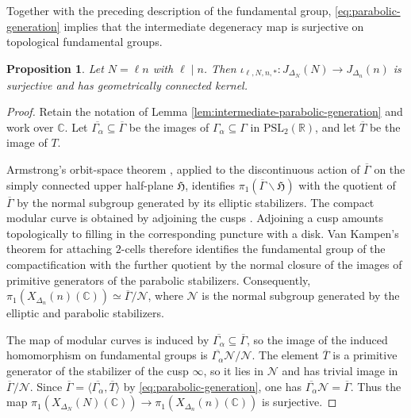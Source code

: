 \documentclass[12pt, letterpaper]{amsart}
\newtheorem{proposition}[theorem]{Proposition}
\theoremstyle{definition}
\theoremstyle{remark}
\newcommand{\C}{\mathbb C}
\numberwithin{equation}{section}
\begin{document}
Together with the preceding description of the fundamental group,
\eqref{eq:parabolic-generation} implies that the intermediate degeneracy map
is surjective on topological fundamental groups.

\begin{proposition}\label{prop:intermediate-connected-pushforward}
Let \(N=\ell n\) with \(\ell\mid n\). Then
\(\iota_{\ell,N,n,*}:J_{\Delta_N}(N)\to
J_{\Delta_n}(n)\) is surjective and has geometrically connected kernel.
\end{proposition}

\begin{proof}
Retain the notation of Lemma \ref{lem:intermediate-parabolic-generation} and
work over \(\C\). Let \(\overline{\Gamma_\alpha}\subseteq\overline\Gamma\)
be the images of \(\Gamma_\alpha\subseteq\Gamma\) in
\(\mathrm{PSL}_2(\mathbb R)\), and let \(\overline T\) be the image of \(T\).

Armstrong's orbit-space theorem \cite{Armstrong}, applied to the discontinuous
action of \(\overline\Gamma\) on the simply connected upper half-plane
\(\mathfrak H\), identifies
\(\pi_1(\overline\Gamma\backslash\mathfrak H)\) with the quotient of
\(\overline\Gamma\) by the normal subgroup generated by its elliptic stabilizers.
The compact modular curve is obtained by adjoining the cusps
\cite{DiamondShurman}. Adjoining a cusp amounts topologically to
filling in the corresponding puncture with a disk. Van Kampen's theorem for
attaching \(2\)-cells \cite{Hatcher} therefore identifies the
fundamental group of the compactification with the further quotient by the
normal closure of the
images of primitive generators of the parabolic stabilizers. Consequently,
\(\pi_1(X_{\Delta_n}(n)(\C))\simeq \overline\Gamma/\mathcal N\), where
\(\mathcal N\) is the normal subgroup generated by the elliptic and
parabolic stabilizers.

The map of modular curves is induced by
\(\overline{\Gamma_\alpha}\subseteq\overline\Gamma\), so the image of the
induced homomorphism on fundamental groups is
\(\overline{\Gamma_\alpha}\mathcal N/\mathcal N\).
The element \(\overline T\) is a primitive generator of the
stabilizer of the cusp \(\infty\), so it lies in \(\mathcal N\) and has trivial
image in \(\overline\Gamma/\mathcal N\). Since
\(\overline\Gamma=\langle\overline{\Gamma_\alpha},\overline T\rangle\) by
\eqref{eq:parabolic-generation}, one has
\(\overline{\Gamma_\alpha}\mathcal N=\overline\Gamma\). Thus the map
\(\pi_1(X_{\Delta_N}(N)(\C))\to\pi_1(X_{\Delta_n}(n)(\C))\) is surjective.



\end{proof}
\end{document}
